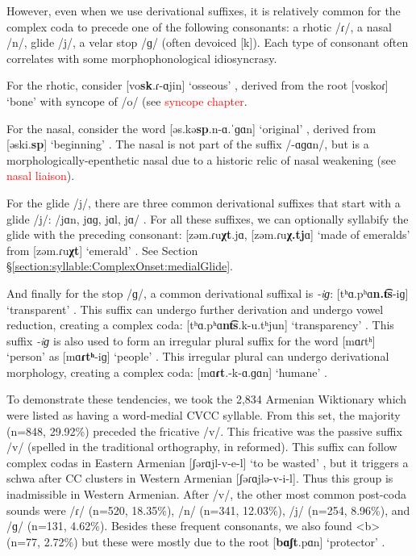 	However, even when we use derivational suffixes,  it is relatively common for the complex coda to precede one of the following consonants:  a rhotic /ɾ/, a nasal /n/, glide /j/, a velar stop /ɡ/ (often devoiced [k]). Each type of consonant often correlates with some morphophonological idiosyncrasy. 
	
	For the rhotic, consider [vo\textbf{sk}.ɾ-ɑjin] `osseous' , derived from the root [voskoɾ] `bone'  with syncope of /o/ (see \textcolor{red}{syncope chapter}.  
	
	For the nasal, consider the word  [əs.kə\textbf{sp}.n-ɑ.ˈɡɑn] `original'  , derived from [əski.\textbf{sp}] `beginning' . The nasal is not part of the suffix /-ɑɡɑn/, but is a morphologically-epenthetic nasal due to a historic relic of nasal weakening (see \textcolor{red}{nasal liaison}). 
	
	For the glide /j/, there are three common derivational suffixes that start with a glide /j/: /jɑn, jɑɡ, jɑl, jɑ/ . For all  these suffixes,  we can optionally syllabify the glide with the preceding consonant: [zəm.ɾu\textbf{χt}.jɑ, [zəm.ɾu\textbf{χ.tj}ɑ] `made of emeralds'   from    [zəm.ɾu\textbf{χt}] `emerald' .  See Section \S\ref{section:syllable:ComplexOnset:medialGlide}.  
	
	And finally for the stop /ɡ/, a common derivational suffixal is \textit{-iɡ}: [tʰɑ.pʰɑ\textbf{n.t͡s}-iɡ] `transparent' . This suffix can undergo further derivation and undergo vowel reduction, creating a complex coda: [tʰɑ.pʰɑ\textbf{nt͡s}.k-u.tʰjun] `transparency' . This suffix \textit{-iɡ} is also used to form an irregular plural suffix for the word [mɑɾtʰ] `person'  as [mɑ\textbf{ɾtʰ}-iɡ] `people' . This irregular plural can undergo derivational morphology,   creating a complex coda:  [mɑ\textbf{ɾt}.-k-ɑ.ɡɑn] `humane'  . 
	
	
	To demonstrate these tendencies, we took the 2,834  Armenian Wiktionary which were listed as having a word-medial CVCC syllable.   From this set, the majority (n=848, 29.92\%) preceded the fricative /v/. This fricative was the passive suffix  /v/ (spelled  in the traditional orthography,  in reformed). This suffix can follow complex codas in Eastern Armenian [ʃərɑjl-v-e-l] `to be wasted' , but it triggers a schwa after CC clusters in Western Armenian [ʃəɾɑjlə-v-i-l]. Thus this group is inadmissible in Western Armenian. After /v/, the other most common   post-coda sounds were  /ɾ/  (n=520, 18.35\%), 
	/n/  (n=341, 12.03\%),   /j/  (n=254, 	8.96\%), and /ɡ/  (n=131, 4.62\%). Besides these frequent consonants, we also found  <b>   (n=77, 2.72\%) but these were mostly due to the root  [\textbf{bɑʃt}.pɑn] `protector' .  
	

